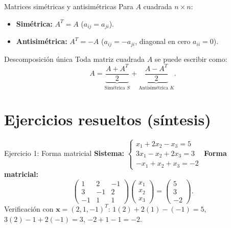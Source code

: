 \documentclass[11pt]{beamer}
\newcommand{\vv}[1]{\mathbf{#1}}
\begin{document}
\begin{frame}{Matrices simétricas y antisimétricas}
  Para $A$ cuadrada $n\times n$:
  \begin{itemize}
    \item \textbf{Simétrica:} $A^T = A$ \quad ($a_{ij} = a_{ji}$).
    \item \textbf{Antisimétrica:} $A^T = -A$ \quad ($a_{ij} = -a_{ji}$, diagonal en cero $a_{ii}=0$).
  \end{itemize}
  \vfill
  \begin{block}{Descomposición única}
    Toda matriz cuadrada $A$ se puede escribir como:
    \[
      A = \underbrace{\frac{A + A^T}{2}}_{\text{Simétrica } S} + \underbrace{\frac{A - A^T}{2}}_{\text{Antisimétrica } K}.
    \]
  \end{block}
\end{frame}

\section{Ejercicios resueltos (síntesis)}

\begin{frame}{Ejercicio 1: Forma matricial}
  \textbf{Sistema:}
  $\begin{cases} x_1 + 2x_2 - x_3 = 5 \\ 3x_1 - x_2 + 2x_3 = 3 \\ -x_1 + x_2 + x_3 = -2 \end{cases}$
  \vfill
  \textbf{Forma matricial:}
  \[
    \begin{pmatrix} 1 & 2 & -1 \\ 3 & -1 & 2 \\ -1 & 1 & 1 \end{pmatrix} \begin{pmatrix} x_1 \\ x_2 \\ x_3 \end{pmatrix} = \begin{pmatrix} 5 \\ 3 \\ -2 \end{pmatrix}.
  \]
  Verificación con $\vv{x}=(2,1,-1)^T$:
  $1(2)+2(1)-(-1)=5$, $3(2)-1+2(-1)=3$, $-2+1-1=-2$. \checkmark
\end{frame}
\end{document}
